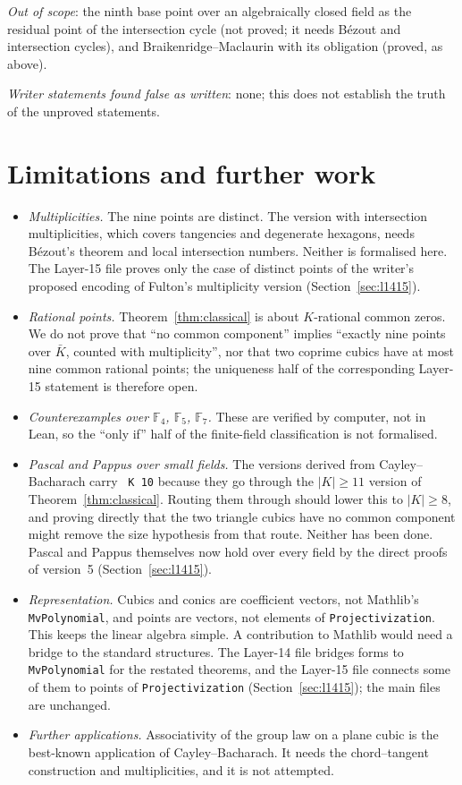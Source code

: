 \documentclass[11pt]{article}
\theoremstyle{definition}
\theoremstyle{remark}
\newcommand{\lean}[1]{\texttt{#1}}
\newcommand{\F}{\mathbb{F}}
\begin{document}
\emph{Out of scope}: the ninth base point over an algebraically closed field as the residual point of the
intersection cycle (not proved; it needs B\'ezout and intersection cycles), and Braikenridge--Maclaurin
with its obligation (proved, as above).

\emph{Writer statements found false as written}: none; this does not establish the truth of the
unproved statements.

\section{Limitations and further work}

\begin{itemize}
\item \emph{Multiplicities.} The nine points are distinct. The version with intersection
multiplicities, which covers tangencies and degenerate hexagons, needs B\'ezout's theorem and
local intersection numbers. Neither is formalised here. The Layer-15 file proves only the case of
distinct points of the writer's proposed encoding of Fulton's multiplicity version (Section~\ref{sec:l1415}).
\item \emph{Rational points.} Theorem~\ref{thm:classical} is about $K$-rational common zeros.
We do not prove that ``no common component'' implies ``exactly nine points over $\bar K$, counted
with multiplicity'', nor that two coprime cubics have at most nine common rational points; the
uniqueness half of the corresponding Layer-15 statement is therefore open.
\item \emph{Counterexamples over $\F_4$, $\F_5$, $\F_7$.} These are verified by computer, not in
Lean, so the ``only if'' half of the finite-field classification is not formalised.
\item \emph{Pascal and Pappus over small fields.} The versions derived from Cayley--Bacharach carry
~\lean{K 10} because they go through the $|K|\ge11$ version of
Theorem~\ref{thm:classical}. Routing them through  should lower
this to $|K|\ge8$, and proving directly that the two triangle cubics have no common component might
remove the size hypothesis from that route. Neither has been done. Pascal and Pappus themselves now
hold over every field by the direct proofs of version~5 (Section~\ref{sec:l1415}).
\item \emph{Representation.} Cubics and conics are coefficient vectors, not Mathlib's
\lean{MvPolynomial}, and points are vectors, not elements of \lean{Projectivization}. This keeps
the linear algebra simple. A contribution to Mathlib would need a bridge to the standard
structures. The Layer-14 file bridges forms to \lean{MvPolynomial} for the restated theorems, and the
Layer-15 file connects some of them to points of \lean{Projectivization}
(Section~\ref{sec:l1415}); the main files are unchanged.
\item \emph{Further applications.} Associativity of the group law on a plane cubic is the best-known
application of Cayley--Bacharach. It needs the chord--tangent construction and multiplicities, and
it is not attempted.
\end{itemize}
\end{document}
